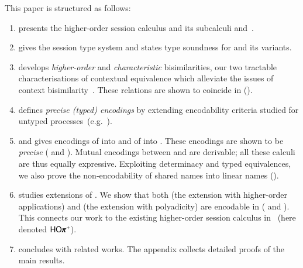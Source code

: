 \smallskip

 This paper 
is structured as follows:
%
\begin{enumerate}[$\bullet$]

	\item	{} presents the higher-order session calculus \HOp and its 
		subcalculi \HO and~\sessp. 

	\item	{} gives the session type system
		and states type soundness for \HOp and its variants.

	\item	{} 
		develops \emph{higher-order} and \emph{characteristic} bisimilarities, our two
		tractable characterisations of contextual equivalence which 
		alleviate the issues of context bisimilarity~\cite{San96H}. These 
		relations are shown to coincide in \HOp ().

	\item	{} defines \emph{precise (typed) encodings} by extending encodability criteria 
		studied for
		untyped processes~(e.g.~\cite{DBLP:journals/iandc/Gorla10,DBLP:conf/icalp/LanesePSS10}).

	\item	{} and 
		gives encodings of \HOp into \HO and of \HOp into \sessp.
		These encodings 
		are shown to be \emph{precise} ( and ).
		Mutual encodings between \sessp and \HO are derivable; 
		all these calculi are thus equally expressive.
		Exploiting determinacy and typed equivalences,
		we also prove the non-encodability of shared names
		into linear names ().

	\item	{} studies extensions of \HOp. We show that 
		both \HOpp (the extension with higher-order applications) 
		and \pHOp (the extension with polyadicity) are encodable in \HOp
		( and ).
		This connects our work 
		to the existing
		higher-order session calculus in~\cite{tlca07} (here denoted  $\pHOpp$).

	\item	{} concludes with related works.
The appendix collects detailed proofs of the main results.
\end{enumerate}

